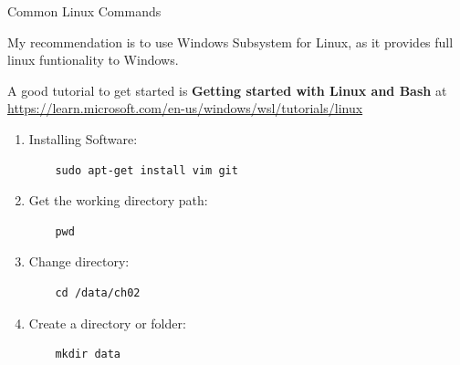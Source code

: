 \documentclass[aspectratio=169,xcolor=dvipsnames,svgnames,x11names,fleqn]{beamer}
\begin{document}
\begin{frame}[containsverbatim]{Common Linux Commands}

\footnotesize

My recommendation is to use Windows Subsystem for Linux, as it provides full linux funtionality to Windows.

\vspace{10pt}

A good tutorial to get started is \textbf{Getting started with Linux and Bash
} at \url{https://learn.microsoft.com/en-us/windows/wsl/tutorials/linux}

\begin{tblock}{}

\begin{enumerate}
    \item Installing Software: 
    
    \begin{verbatim}
    sudo apt-get install vim git
    \end{verbatim}

    \item Get the working directory path:
    
    \begin{verbatim}
    pwd
    \end{verbatim}

    \item Change directory:
    
    \begin{verbatim}
    cd /data/ch02
    \end{verbatim}

    \item Create a directory or folder:
    
    \begin{verbatim}
    mkdir data
    \end{verbatim}

\end{enumerate}


\end{tblock}
    
\end{frame}
\end{document}
